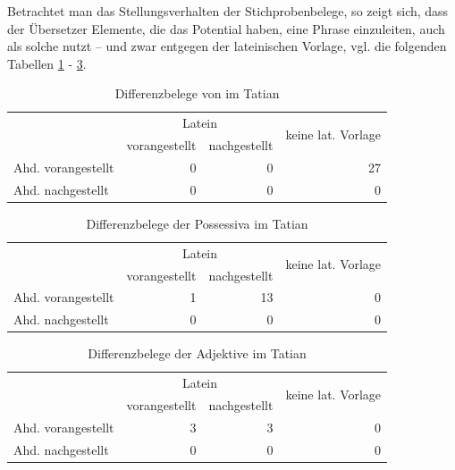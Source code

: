 Betrachtet man das Stellungsverhalten der Stichprobenbelege, so zeigt sich, dass der Übersetzer Elemente, die das Potential haben, eine Phrase einzuleiten, auch als solche nutzt -- und zwar entgegen der lateinischen Vorlage, vgl. die folgenden Tabellen \ref{tab:diff-ther-tatian} - \ref{tab:diff-adj-tatian}.  

\begin{table}
\centering
\begin{tabular}{@{}lrrr@{}}
\toprule
& \multicolumn{2}{c}{Latein} & \multirow{2}{*}{keine lat. Vorlage}\\
 \cmidrule(lr){2-3}
                   & vorangestellt & nachgestellt & \\ \midrule
Ahd. vorangestellt & 0                  & 0                 & 27                    \\
Ahd. nachgestellt  & 0                  & 0                 & 0                    \\ \bottomrule
\end{tabular}
\caption{Differenzbelege von  im Tatian}
\label{tab:diff-ther-tatian}
\end{table}

\begin{table}
\centering
\begin{tabular}{@{}lrrr@{}}
\toprule
                   & \multicolumn{2}{c}{Latein} & \multirow{2}{*}{keine lat. Vorlage}\\
 \cmidrule(lr){2-3}
                   & vorangestellt & nachgestellt & \\ \midrule
Ahd. vorangestellt & 1                  & 13                 & 0                    \\
Ahd. nachgestellt  & 0                  & 0                 & 0                    \\ \bottomrule
\end{tabular}
\caption{Differenzbelege der Possessiva im Tatian}
\label{tab:diff-poss-tatian}
\end{table}

\begin{table}
\centering
\begin{tabular}{@{}lrrr@{}}
\toprule
                   & \multicolumn{2}{c}{Latein} & \multirow{2}{*}{keine lat. Vorlage}\\
 \cmidrule(lr){2-3}
                   & vorangestellt & nachgestellt & \\ \midrule
Ahd. vorangestellt & 3                  & 3                & 0                    \\
Ahd. nachgestellt  & 0                  & 0                 & 0                    \\ \bottomrule
\end{tabular}
\caption{Differenzbelege der Adjektive im Tatian}
\label{tab:diff-adj-tatian}
\end{table}


